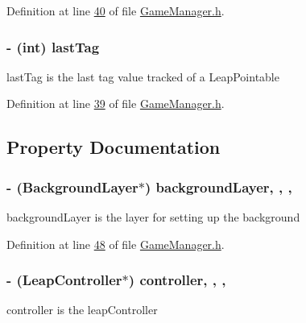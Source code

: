 Definition at line \hyperlink{_game_manager_8h_source_l00040}{40} of file \hyperlink{_game_manager_8h_source}{Game\-Manager.\-h}.

\hypertarget{interface_game_manager_a0b83b09829718f85c17d64f6ee06d441}{
\subsubsection[{last\-Tag}]{\setlength{\rightskip}{0pt plus 5cm}-\/ (int) last\-Tag\hspace{0.3cm}{\ttfamily [protected]}}}\label{d4/d94/interface_game_manager_a0b83b09829718f85c17d64f6ee06d441}
last\-Tag is the last tag value tracked of a Leap\-Pointable 

Definition at line \hyperlink{_game_manager_8h_source_l00039}{39} of file \hyperlink{_game_manager_8h_source}{Game\-Manager.\-h}.



\subsection{Property Documentation}
\hypertarget{interface_game_manager_a2a3a96f1202b13592f244cf1402b4051}{
\subsubsection[{background\-Layer}]{\setlength{\rightskip}{0pt plus 5cm}-\/ ({\bf Background\-Layer}$\ast$) background\-Layer\hspace{0.3cm}{\ttfamily [read]}, {\ttfamily [write]}, {\ttfamily [nonatomic]}, {\ttfamily [strong]}}}\label{d4/d94/interface_game_manager_a2a3a96f1202b13592f244cf1402b4051}
background\-Layer is the layer for setting up the background 

Definition at line \hyperlink{_game_manager_8h_source_l00048}{48} of file \hyperlink{_game_manager_8h_source}{Game\-Manager.\-h}.

\hypertarget{interface_game_manager_a4b089253ae3569099d28535b128f3436}{
\subsubsection[{controller}]{\setlength{\rightskip}{0pt plus 5cm}-\/ (Leap\-Controller$\ast$) controller\hspace{0.3cm}{\ttfamily [read]}, {\ttfamily [write]}, {\ttfamily [nonatomic]}, {\ttfamily [strong]}}}\label{d4/d94/interface_game_manager_a4b089253ae3569099d28535b128f3436}
controller is the leap\-Controller 

